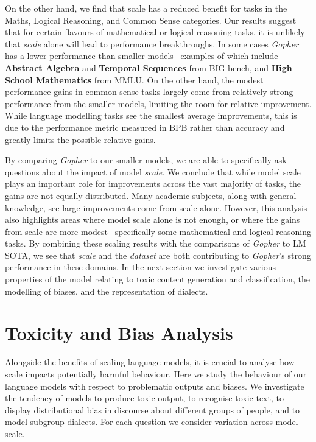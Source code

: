 \documentclass[11pt, a4paper, logo, internal, copyright, nonumbering]{deepmind}
\newcommand{\gopher}{\textit{Gopher}\xspace}
\newcommand{\bigbench}{BIG-bench\xspace}
\begin{document}
On the other hand, we find that scale has a reduced benefit for tasks in the Maths, Logical Reasoning, and Common Sense categories.
Our results suggest that for certain flavours of mathematical or logical reasoning tasks, it is unlikely that \textit{scale} alone will lead to performance breakthroughs. 
In some cases \gopher has a lower performance than smaller models-- examples of which include \textbf{Abstract Algebra} and \textbf{Temporal Sequences} from \bigbench, and \textbf{High School Mathematics} from MMLU.
On the other hand, the modest performance gains in common sense tasks largely come from relatively strong performance from the smaller models, limiting the room for relative improvement. 
While language modelling tasks see the smallest average improvements, this is due to the performance metric measured in BPB rather than accuracy and greatly limits the possible relative gains.

By comparing \gopher to our smaller models, we are able to specifically ask questions about the impact of model \textit{scale}. 
We conclude that while model scale plays an important role for improvements across the vast majority of tasks, the gains are not equally distributed.
Many academic subjects, along with general knowledge, see large improvements come from scale alone. 
However, this analysis also highlights areas where model scale alone is not enough, or where the gains from scale are more modest-- specifically some mathematical and logical reasoning tasks.
By combining these scaling results with the comparisons of \gopher to LM SOTA, we see that \textit{scale} and the \textit{dataset} are both contributing to \gopher's strong performance in these domains.
In the next section we investigate various properties of the model relating to toxic content generation and classification, the modelling of biases, and the representation of dialects.



\section{Toxicity and Bias Analysis}
\label{sec:model_analysis}

Alongside the benefits of scaling language models, it is crucial to analyse how scale impacts potentially harmful behaviour. Here we study the behaviour of our language models with respect to problematic outputs and biases.
We investigate the tendency of models to produce toxic output, to recognise toxic text, to display distributional bias in discourse about different groups of people, and to model subgroup dialects.
For each question we consider variation across model scale.
\end{document}

